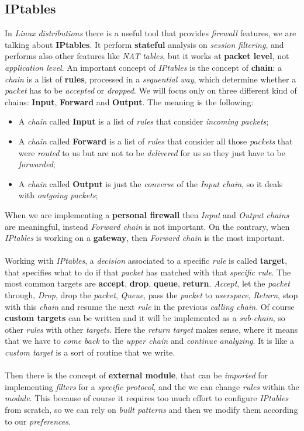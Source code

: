 \documentclass{article}
\begin{document}
\subsection{IPtables}
In \emph{Linux distributions} there is a useful tool that provides \emph{firewall} features, we are talking about \textbf{IPtables}. It perform \textbf{stateful} analysis on \emph{session filtering}, and performs also other features like \emph{NAT tables}, but it works at \textbf{packet level}, not \emph{application level}. An important concept of \emph{IPtables} is the concept of \textbf{chain}: a \emph{chain} is a list of \textbf{rules}, processed in a \emph{sequential way}, which determine whether a \emph{packet} has to be \emph{accepted} or \emph{dropped}. We will focus only on three different kind of chains: \textbf{Input}, \textbf{Forward} and \textbf{Output}. The meaning is the following:
\begin{itemize}
\item A \emph{chain} called \textbf{Input} is a list of \emph{rules} that consider \emph{incoming packets};
\item A \emph{chain} called \textbf{Forward} is a list of \emph{rules} that consider all those \emph{packets} that were \emph{routed} to us but are not to be \emph{delivered} for us so they just have to be \emph{forwarded};
\item A \emph{chain} called \textbf{Output} is just the \emph{converse} of the \emph{Input chain}, so it deals with \emph{outgoing packets};
\end{itemize}
When we are implementing a \textbf{personal firewall} then \emph{Input} and \emph{Output chains} are meaningful, instead \emph{Forward chain} is not important. On the contrary, when \emph{IPtables} is working on a \textbf{gateway}, then \emph{Forward chain} is the most important.  \\\\
Working with \emph{IPtables}, a \emph{decision} associated to a specific \emph{rule} is called \textbf{target}, that specifies what to do if that \emph{packet} has matched with that \emph{specific rule}. The most common targets are \textbf{accept}, \textbf{drop}, \textbf{queue}, \textbf{return}. \emph{Accept}, let the \emph{packet} through, \emph{Drop}, drop the \emph{packet}, \emph{Queue}, pass the \emph{packet} to \emph{userspace}, \emph{Return}, stop with this \emph{chain} and resume the next \emph{rule} in the previous \emph{calling chain}. Of course \textbf{custom targets} can be written and it will be implemented as a \emph{sub-chain}, so other \emph{rules} with other \emph{targets}. Here the \emph{return target} makes sense, where it means that we have to \emph{come back }to the \emph{upper chain} and \emph{continue analyzing}. It is like a \emph{custom target} is a sort of routine that we write. \\\\
Then there is the concept of \textbf{external module}, that can be \emph{imported} for implementing \emph{filters} for a \emph{specific protocol}, and the we can change \emph{rules} within the \emph{module}. This because of course it requires too much effort to configure \emph{IPtables} from scratch, so we can rely on \emph{built patterns} and then we modify them according to our \emph{preferences}.
\clearpage
\end{document}
